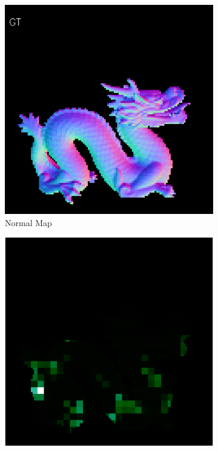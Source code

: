 \begin{figure}[H]
	\centering
	\captionsetup{width=\linewidth}
	\begin{subfigure}[b]{0.19\linewidth}
		\includegraphics[width=\linewidth]{./Figures/feature_map_gcnn/feature_map_normal_gcnn-cnn.png}
		\caption{Normal Map}
	\end{subfigure}
	\begin{subfigure}[b]{0.19\linewidth}
		\includegraphics[width=\linewidth]{./Figures/feature_map_gcnn/feature_map_gcnn-cnn_46.png}

\end{subfigure}
\end{figure}
